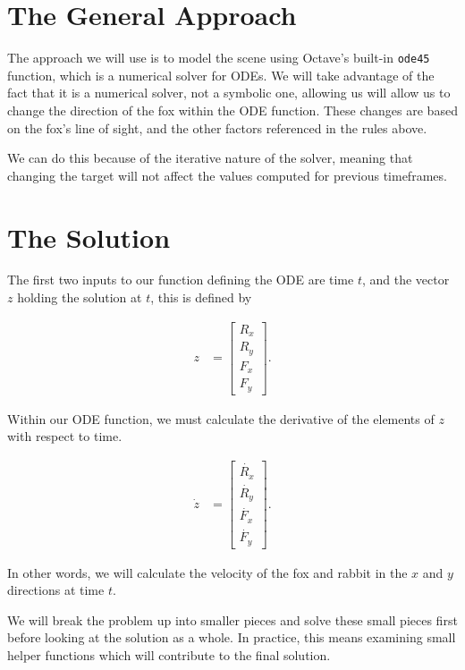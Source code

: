 \section{The General Approach}

The approach we will use is to model the scene using Octave's built-in \texttt{ode45} function, which is a numerical solver for ODEs. We will take advantage of the fact that it is a numerical solver, not a symbolic one, allowing us will allow us to change the direction of the fox within the ODE function. These changes are based on the fox's line of sight, and the other factors referenced in the rules above. 

We can do this because of the iterative nature of the solver, meaning that changing the target will not affect the values computed for previous timeframes.

\section {The Solution}

The first two inputs to our function defining the ODE are time $t$, and the vector $z$ holding the solution at $t$, this is defined by

\begin{align}
    z &= \begin{bmatrix}
           R_x \\
           R_y \\
           F_x \\
           F_y
         \end{bmatrix}.
  \end{align}

Within our ODE function, we must calculate the derivative of the elements of $z$ with respect to time. 

\begin{align}
    \dot{z} &= \begin{bmatrix}
            \dot{R_x} \\
            \dot{R_y} \\
            \dot{F_x} \\
            \dot{F_y}
         \end{bmatrix}.
  \end{align}
 
In other words, we will calculate the velocity of the fox and rabbit in the $x$ and $y$ directions at time $t$.

We will break the problem up into smaller pieces and solve these small pieces first before looking at the solution as a whole. In practice, this means examining small helper functions which will contribute to the final solution.

